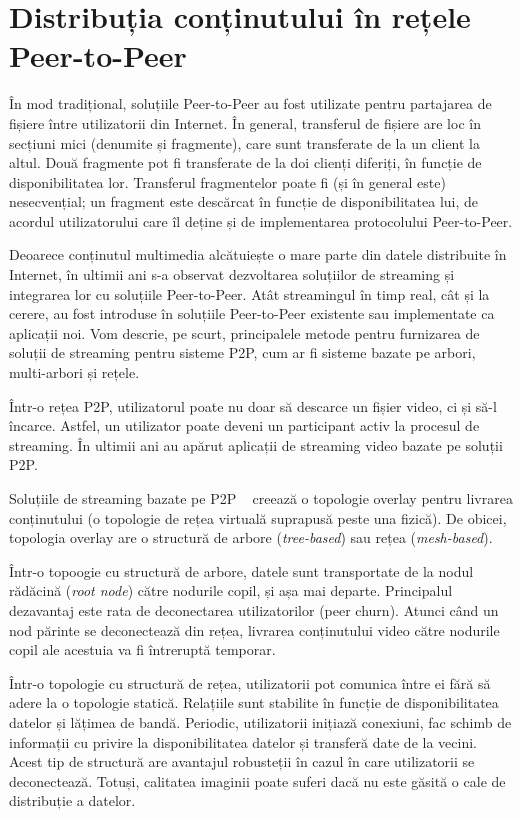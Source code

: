 \section{Distribuția conținutului în rețele Peer-to-Peer}
\label{sec:p2p-systems:streaming}

În mod tradițional, soluțiile Peer-to-Peer au fost utilizate pentru partajarea
de fișiere între utilizatorii din Internet. În general, transferul de fișiere
are loc în secțiuni mici (denumite și fragmente), care sunt transferate de
la un client la altul. Două fragmente pot fi transferate de la doi clienți
diferiți, în funcție de disponibilitatea lor. Transferul fragmentelor poate fi
(și în general este) nesecvențial; un fragment este descărcat în funcție de
disponibilitatea lui, de acordul utilizatorului care îl deține și de
implementarea protocolului Peer-to-Peer.

Deoarece conținutul multimedia alcătuiește o mare parte din datele distribuite
în Internet, în ultimii ani s-a observat dezvoltarea soluțiilor de streaming
și integrarea lor cu soluțiile Peer-to-Peer. Atât streamingul în timp real,
cât și la cerere, au fost introduse în soluțiile Peer-to-Peer existente sau
implementate ca aplicații noi. Vom descrie, pe scurt, principalele metode
pentru furnizarea de soluții de streaming pentru sisteme P2P, cum ar fi
sisteme bazate pe arbori, multi-arbori și rețele.

Într-o rețea P2P, utilizatorul poate nu doar să descarce un fișier video,
ci și să-l încarce. Astfel, un utilizator poate deveni un participant activ
la procesul de streaming. În ultimii ani au apărut aplicații de streaming video
bazate pe soluții P2P.

Soluțiile de streaming bazate pe P2P ~\cite{p2p-streaming-survey} creează o
topologie overlay pentru livrarea conținutului (o topologie de rețea virtuală
suprapusă peste una fizică). De obicei, topologia overlay are o structură
de arbore (\textit{tree-based}) sau rețea (\textit{mesh-based}).

Într-o topoogie cu structură de arbore, datele sunt transportate de la nodul
rădăcină (\textit{root node}) către nodurile copil, și așa mai departe.
Principalul dezavantaj este rata de deconectarea utilizatorilor (peer churn).
Atunci când un nod părinte se deconectează din rețea, livrarea conținutului
video către nodurile copil ale acestuia va fi întreruptă temporar.

Într-o topologie cu structură de rețea, utilizatorii pot comunica între ei
fără să adere la o topologie statică. Relațiile sunt stabilite în funcție de
disponibilitatea datelor și lățimea de bandă. Periodic, utilizatorii inițiază
conexiuni, fac schimb de informații cu privire la disponibilitatea datelor și
transferă date de la vecini. Acest tip de structură are avantajul robusteții
în cazul în care utilizatorii se deconectează. Totuși, calitatea imaginii poate
suferi dacă nu este găsită o cale de distribuție a datelor.

